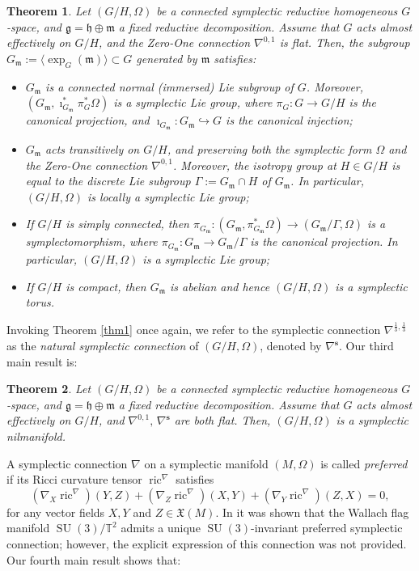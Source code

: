 \documentclass[preprint,12pt,1p]{elsarticle}
\theoremstyle{plain}
\newtheorem{theorem}{Theorem}[section]
\theoremstyle{definition}
\newcommand{\vecf}{\mathfrak{X}}
\newcommand{\n}{\nabla}
\newcommand{\ns}{\n^\mathbf{s}}
\newcommand{\g}{\mathfrak{g}}
\newcommand{\h}{\mathfrak{h}}
\newcommand{\m}{\mathfrak{m}}
\newcommand{\ric}{\operatorname{ric}}
\numberwithin{equation}{section}
\newcommand{\SU}{\operatorname{SU}}
\begin{document}
\begin{theorem}\label{Theo1Flat1}
Let $(G/H,\Omega)$ be a connected symplectic reductive homogeneous $G$-space, and $\g=\h\oplus\m$ a fixed reductive decomposition. Assume that $G$ acts almost effectively on $G/H$, and the Zero-One connection $\n^{0,1}$ is flat. Then, the subgroup $G_\m:=\langle\exp_G(\m)\rangle\subset G$ generated by $\m$ satisfies:
\begin{itemize}
\item[$(1)$] $G_\m$ is a connected normal (immersed) Lie subgroup of $G$. Moreover, $(G_\m,\imath_{G_\m}^*\pi_G^*\Omega)$ is a symplectic Lie group, where $\pi_G:G\to G/H$ is the canonical projection, and $\imath_{G_\m}:G_\m\hookrightarrow G$ is the canonical injection;
\item[$(2)$] $G_\m$ acts transitively on $G/H$, and preserving both the symplectic form $\Omega$ and the Zero-One connection $\n^{0,1}$. Moreover, the isotropy group at $H\in G/H$ is equal to the discrete Lie subgroup $\Gamma:=G_\m\cap H$ of $G_\m$. In particular, $(G/H,\Omega)$ is locally a symplectic Lie group;
\item[$(3)$] If $G/H$ is simply connected, then $\pi_{G_\m}:(G_\m,\pi_{G_\m}^*\Omega)\to(G_\m/\Gamma,\Omega)$ is a symplectomorphism, where $\pi_{G_\m}:G_\m\to G_\m/\Gamma$ is the canonical projection. In particular, $(G/H,\Omega)$ is a symplectic Lie group;
\item[$(4)$] If $G/H$ is compact, then $G_\m$ is abelian and hence $(G/H,\Omega)$ is a symplectic torus.
\end{itemize} 
\end{theorem}

Invoking Theorem \ref{thm1} once again, we refer to the symplectic connection $\n^{\frac{1}{3},\frac{1}{3}}$ as the \textit{natural symplectic connection} of $(G/H,\Omega)$, denoted by $\ns$. Our third main result is:

\begin{theorem}\label{ThmSympNilman}
Let $(G/H,\Omega)$ be a connected symplectic reductive homogeneous $G$-space, and $\g=\h\oplus\m$ a fixed reductive decomposition. Assume that $G$ acts almost effectively on $G/H$, and $\n^{0,1},\,\n^\mathbf{s}$ are both flat. Then, $(G/H,\Omega)$ is a symplectic nilmanifold.
\end{theorem}
 
A symplectic connection $\n$ on a symplectic manifold $(M,\Omega)$ is called \textit{preferred} if its Ricci curvature tensor $\ric^{\n}$ satisfies 
$$\left(\n_{X}\ric^{\n}\right)\left(Y,Z\right)+\left(\n_{Z}\ric^{\n}\right)\left(X,Y\right)+\left(\n_{Y}\ric^{\n}\right)\left(Z,X\right)=0,$$ for any vector fields $X,Y$ and $Z\in\vecf(M)$.
In \cite[pp. $362$-$363$]{Cah1} it was shown that the Wallach flag manifold $\SU(3)/\mathbb{T}^2$ admits a unique
$\SU(3)$-invariant preferred symplectic connection; however, the explicit expression of this connection was not provided. Our fourth main result shows that:
\end{document}
